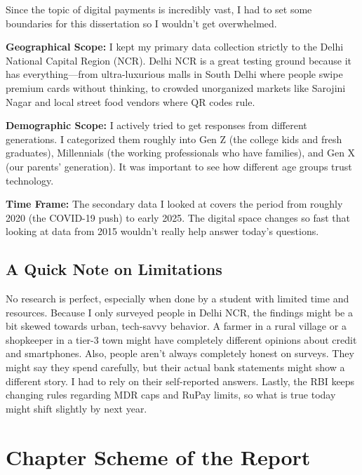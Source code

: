 Since the topic of digital payments is incredibly vast, I had to set some boundaries for this dissertation so I wouldn't get overwhelmed.

\textbf{Geographical Scope:} I kept my primary data collection strictly to the Delhi National Capital Region (NCR). Delhi NCR is a great testing ground because it has everything---from ultra-luxurious malls in South Delhi where people swipe premium cards without thinking, to crowded unorganized markets like Sarojini Nagar and local street food vendors where QR codes rule.

\textbf{Demographic Scope:} I actively tried to get responses from different generations. I categorized them roughly into Gen Z (the college kids and fresh graduates), Millennials (the working professionals who have families), and Gen X (our parents' generation). It was important to see how different age groups trust technology.

\textbf{Time Frame:} The secondary data I looked at covers the period from roughly 2020 (the COVID-19 push) to early 2025. The digital space changes so fast that looking at data from 2015 wouldn't really help answer today's questions.

\subsection{A Quick Note on Limitations}
No research is perfect, especially when done by a student with limited time and resources. Because I only surveyed people in Delhi NCR, the findings might be a bit skewed towards urban, tech-savvy behavior. A farmer in a rural village or a shopkeeper in a tier-3 town might have completely different opinions about credit and smartphones. Also, people aren't always completely honest on surveys. They might say they spend carefully, but their actual bank statements might show a different story. I had to rely on their self-reported answers. Lastly, the RBI keeps changing rules regarding MDR caps and RuPay limits, so what is true today might shift slightly by next year.

\section{Chapter Scheme of the Report}

